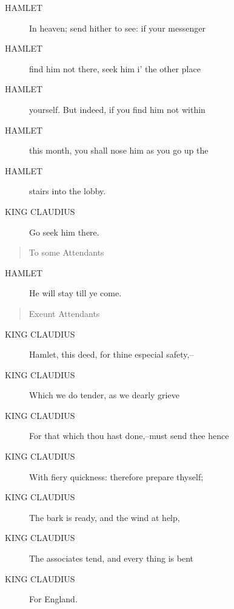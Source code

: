 \documentclass{article}
\begin{document}
\begin{description}
            
\item[HAMLET] In heaven; send hither to see: if your messenger
\item[HAMLET] find him not there, seek him i' the other place
\item[HAMLET] yourself. But indeed, if you find him not within
\item[HAMLET] this month, you shall nose him as you go up the
\item[HAMLET] stairs into the lobby.
\end{description}
          
\begin{description}
            
\item[KING CLAUDIUS] Go seek him there.
\end{description}
          
\begin{quote}
To some Attendants
\end{quote}
          
\begin{description}
            
\item[HAMLET] He will stay till ye come.
\end{description}
          
\begin{quote}
Exeunt Attendants
\end{quote}
          
\begin{description}
            
\item[KING CLAUDIUS] Hamlet, this deed, for thine especial safety,--
\item[KING CLAUDIUS] Which we do tender, as we dearly grieve
\item[KING CLAUDIUS] For that which thou hast done,--must send thee hence
\item[KING CLAUDIUS] With fiery quickness: therefore prepare thyself;
\item[KING CLAUDIUS] The bark is ready, and the wind at help,
\item[KING CLAUDIUS] The associates tend, and every thing is bent
\item[KING CLAUDIUS] For England.
\end{description}
          
\end{document}
